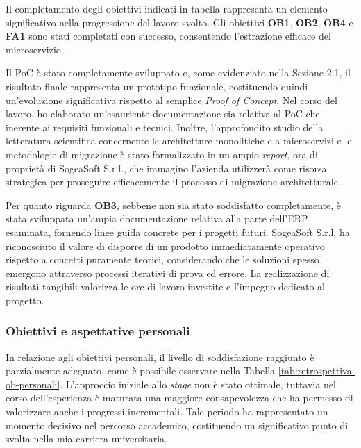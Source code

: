         \vspace{0.2 em}
        \noindent Il completamento degli obiettivi indicati in tabella rappresenta un elemento significativo nella progressione del lavoro svolto. Gli obiettivi \textbf{OB1}, \textbf{OB2}, \textbf{OB4} e \textbf{FA1} sono stati completati con successo, consentendo l'estrazione efficace del microservizio.

        \vspace{0.2 em}
        \noindent Il PoC è stato completamente sviluppato e, come evidenziato nella Sezione 2.1, il risultato finale rappresenta un prototipo funzionale, costituendo quindi un'evoluzione significativa rispetto al semplice \textit{Proof of Concept}. Nel corso del lavoro, ho elaborato un'esauriente documentazione sia relativa al PoC che inerente ai requisiti funzionali e tecnici. Inoltre, l'approfondito studio della letteratura scientifica concernente le architetture monolitiche e a microservizi e le metodologie di migrazione è stato formalizzato in un ampio \textit{report}, ora di proprietà di SogeaSoft S.r.l., che immagino l'azienda utilizzerà come risorsa strategica per proseguire efficacemente il processo di migrazione architetturale.

        \vspace{0.2 em}
        \noindent Per quanto riguarda \textbf{OB3}, sebbene non sia stato soddisfatto completamente, è stata sviluppata un'ampia documentazione relativa alla parte dell'ERP esaminata, fornendo linee guida concrete per i progetti futuri. SogeaSoft S.r.l. ha riconosciuto il valore di disporre di un prodotto immediatamente operativo rispetto a concetti puramente teorici, considerando che le soluzioni spesso emergono attraverso processi iterativi di prova ed errore. La realizzazione di risultati tangibili valorizza le ore di lavoro investite e l'impegno dedicato al progetto.

        
        \subsubsection{Obiettivi e aspettative personali}

        In relazione agli obiettivi personali, il livello di soddisfazione raggiunto è parzialmente adeguato, come è possibile osservare nella Tabella \ref{tab:retrospettiva-ob-personali}. L'approccio iniziale allo \textit{stage} non è stato ottimale, tuttavia nel corso dell'esperienza è maturata una maggiore consapevolezza che ha permesso di valorizzare anche i progressi incrementali. Tale periodo ha rappresentato un momento decisivo nel percorso accademico, costituendo un significativo punto di svolta nella mia carriera universitaria.

